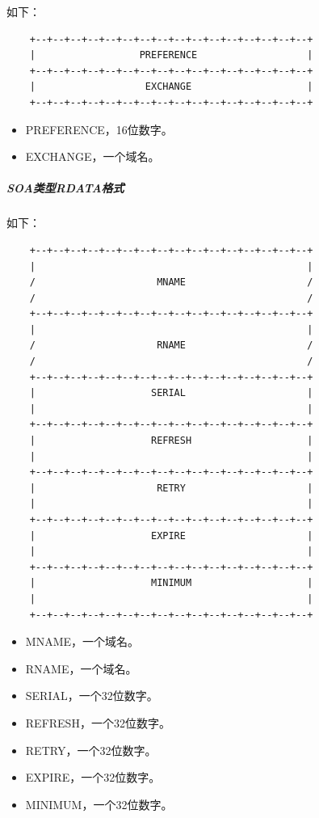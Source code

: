 \documentclass[lang=cn,11pt,a4paper,cite=authornum]{paper}
\begin{document}
如下：

\begin{code}
\begin{verbatim}
    +--+--+--+--+--+--+--+--+--+--+--+--+--+--+--+--+
    |                  PREFERENCE                   |
    +--+--+--+--+--+--+--+--+--+--+--+--+--+--+--+--+
    |                   EXCHANGE                    |
    +--+--+--+--+--+--+--+--+--+--+--+--+--+--+--+--+
\end{verbatim}
\end{code}

\begin{itemize}
    \item PREFERENCE，16位数字。
    \item EXCHANGE，一个域名。
\end{itemize}

\subparagraph{SOA类型RDATA格式}

如下：

\begin{code}
\begin{verbatim}
    +--+--+--+--+--+--+--+--+--+--+--+--+--+--+--+--+
    |                                               |
    /                     MNAME                     /
    /                                               /
    +--+--+--+--+--+--+--+--+--+--+--+--+--+--+--+--+
    |                                               |
    /                     RNAME                     /
    /                                               /
    +--+--+--+--+--+--+--+--+--+--+--+--+--+--+--+--+
    |                    SERIAL                     |
    |                                               |
    +--+--+--+--+--+--+--+--+--+--+--+--+--+--+--+--+
    |                    REFRESH                    |
    |                                               |
    +--+--+--+--+--+--+--+--+--+--+--+--+--+--+--+--+
    |                     RETRY                     |
    |                                               |
    +--+--+--+--+--+--+--+--+--+--+--+--+--+--+--+--+
    |                    EXPIRE                     |
    |                                               |
    +--+--+--+--+--+--+--+--+--+--+--+--+--+--+--+--+
    |                    MINIMUM                    |
    |                                               |
    +--+--+--+--+--+--+--+--+--+--+--+--+--+--+--+--+
\end{verbatim}
\end{code}

\begin{itemize}
    \item MNAME，一个域名。
    \item RNAME，一个域名。
    \item SERIAL，一个32位数字。
    \item REFRESH，一个32位数字。
    \item RETRY，一个32位数字。
    \item EXPIRE，一个32位数字。
    \item MINIMUM，一个32位数字。
\end{itemize}
\end{document}
